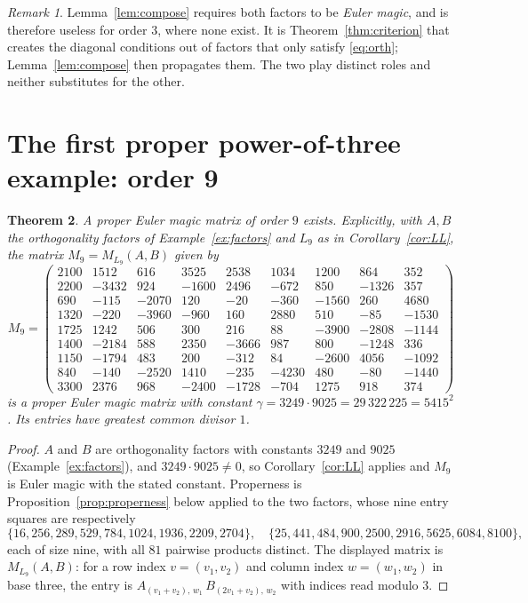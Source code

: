 \documentclass[11pt,a4paper]{amsart}
\theoremstyle{plain}
\newtheorem{theorem}{Theorem}[section]
\theoremstyle{definition}
\theoremstyle{remark}
\newtheorem{remark}[theorem]{Remark}
\begin{document}
\begin{remark}\label{rem:notkronlex}
Lemma~\ref{lem:compose} requires both factors to be \emph{Euler magic}, and is
therefore useless for order $3$, where none exist. It is
Theorem~\ref{thm:criterion} that creates the diagonal conditions out of factors
that only satisfy \eqref{eq:orth}; Lemma~\ref{lem:compose} then propagates them.
The two play distinct roles and neither substitutes for the other.
\end{remark}

\section{The first proper power-of-three example: order 9}\label{sec:nine}

\begin{theorem}\label{thm:nine}
A proper Euler magic matrix of order $9$ exists. Explicitly, with $A,B$ the
orthogonality factors of Example~\ref{ex:factors} and $L_9$ as in
Corollary~\ref{cor:LL}, the matrix $M_9=M_{L_9}(A,B)$ given by
\[
M_9=\begin{pmatrix}
 2100& 1512&  616& 3525& 2538& 1034& 1200&  864&  352\\
 2200&-3432&  924&-1600& 2496& -672&  850&-1326&  357\\
  690& -115&-2070&  120&  -20& -360&-1560&  260& 4680\\
 1320& -220&-3960& -960&  160& 2880&  510&  -85&-1530\\
 1725& 1242&  506&  300&  216&   88&-3900&-2808&-1144\\
 1400&-2184&  588& 2350&-3666&  987&  800&-1248&  336\\
 1150&-1794&  483&  200& -312&   84&-2600& 4056&-1092\\
  840& -140&-2520& 1410& -235&-4230&  480&  -80&-1440\\
 3300& 2376&  968&-2400&-1728& -704& 1275&  918&  374
\end{pmatrix}
\]
is a proper Euler magic matrix with constant
$\gamma=3249\cdot9025=29\,322\,225=5415^2$. Its entries have greatest common
divisor $1$.
\end{theorem}

\begin{proof}
$A$ and $B$ are orthogonality factors with constants $3249$ and $9025$
(Example~\ref{ex:factors}), and $3249\cdot9025\ne0$, so
Corollary~\ref{cor:LL} applies and $M_9$ is Euler magic with the stated
constant. Properness is Proposition~\ref{prop:properness} below applied to
the two factors, whose nine entry squares are respectively
\[
\{16,256,289,529,784,1024,1936,2209,2704\},\quad
\{25,441,484,900,2500,2916,5625,6084,8100\},
\]
each of size nine, with all $81$ pairwise products distinct. The displayed
matrix is $M_{L_9}(A,B)$: for a row index $v=(v_1,v_2)$ and column index
$w=(w_1,w_2)$ in base three, the entry is
$A_{(v_1+v_2),\,w_1}\,B_{(2v_1+v_2),\,w_2}$ with indices read modulo $3$.
\end{proof}
\end{document}
